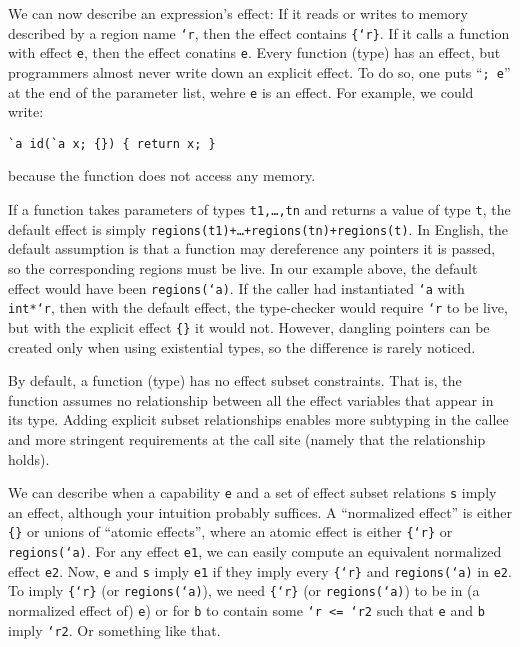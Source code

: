 We can now describe an expression's effect: If it reads or writes to
memory described by a region name \texttt{`r}, then the effect
contains \texttt{\{`r\}}.  If it calls a function with effect
\texttt{e}, then the effect conatins \texttt{e}.  Every function
(type) has an effect, but programmers almost never write down an
explicit effect.  To do so, one puts ``\texttt{; e}'' at the end of
the parameter list, wehre \texttt{e} is an effect.  For example, we
could write:
\begin{verbatim}
`a id(`a x; {}) { return x; }
\end{verbatim}
because the function does not access any memory.

If a function takes parameters of types \texttt{t1,\dots,tn} and
returns a value of type \texttt{t}, the default effect is simply
\texttt{regions(t1)+\dots+regions(tn)+regions(t)}.  In English, the
default assumption is that a function may dereference any pointers it
is passed, so the corresponding regions must be live.  In our example
above, the default effect would have been \texttt{regions(`a)}.  If
the caller had instantiated \texttt{`a} with \texttt{int*`r}, then
with the default effect, the type-checker would require \texttt{`r} to
be live, but with the explicit effect \texttt{\{\}} it would not.
However, dangling pointers can be created only when using existential
types, so the difference is rarely noticed.

By default, a function (type) has no effect subset constraints.  That
is, the function assumes no relationship between all the effect
variables that appear in its type. Adding explicit subset
relationships enables more subtyping in the callee and more stringent
requirements at the call site (namely that the relationship holds).

We can describe when a capability \texttt{e} and a set of effect
 subset relations \texttt{s} imply an effect, although your intuition
 probably suffices.  A ``normalized effect'' is either \texttt{\{\}}
 or unions of ``atomic effects'', where an atomic effect is either
 \texttt{\{`r\}} or \texttt{regions(`a)}.  For any effect \texttt{e1},
 we can easily compute an equivalent normalized effect \texttt{e2}.
 Now, \texttt{e} and \texttt{s} imply \texttt{e1} if they imply every
 \texttt{\{`r\}} and \texttt{regions(`a)} in \texttt{e2}.  To imply
 \texttt{\{`r\}} (or \texttt{regions(`a)}), we need \texttt{\{`r\}}
 (or \texttt{regions(`a)}) to be in (a normalized effect of)
 \texttt{e}) or for \texttt{b} to contain some \texttt{`r <= `r2} such
 that \texttt{e} and \texttt{b} imply \texttt{`r2}. Or something like
 that.

